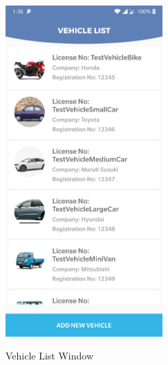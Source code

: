 \documentclass[12pt, english]{article}
\begin{document}
\begin{figure}[h!]
        \begin{minipage}[b]{1\linewidth}
        \centering
        \includegraphics[width=6cm]{Vehicle/Vehicle_List_after_adding_all_types_of_vehicles.jpg}
        \label{arch5}
        \caption{Vehicle List Window}
        \end{minipage}
\end{figure}
\end{document}

